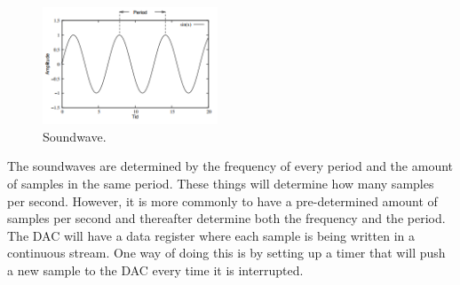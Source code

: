 \begin{figure}[hb]
  \centering
  \includegraphics[height=3.5cm]{images/soundwave}
  \caption[Soundwave]
   {Soundwave. \cite{TDT4528Compendium}}
\end{figure}

The soundwaves are determined by the frequency of every period and the amount of
samples in the same period. These things will determine how many samples per
second. However, it is more commonly to have a pre-determined amount of samples
per second and thereafter determine both the frequency and the period. The DAC
will have a data register where each sample is being written in a continuous
stream. One way of doing this is by setting up a timer that will push a new
sample to the DAC every time it is interrupted. \cite{TDT4528Compendium}